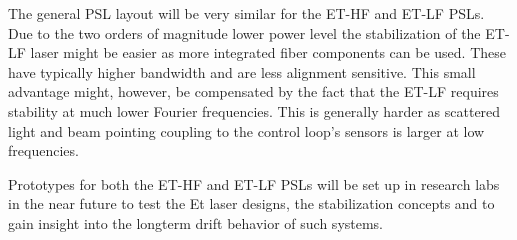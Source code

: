 The general PSL layout will be very similar for the ET-HF and ET-LF PSLs. Due to the two orders of magnitude lower power level the stabilization of the ET-LF laser might be easier as more integrated fiber components can be used. These have typically higher bandwidth and are less alignment sensitive. This small advantage might, however, be compensated by the fact that the ET-LF requires stability at much lower Fourier frequencies. This is generally harder as scattered light and beam pointing coupling to the control loop's sensors is larger at low frequencies. 

Prototypes for both the ET-HF and ET-LF PSLs will be set up in research labs in the near future to test the Et laser designs, the stabilization concepts and to gain insight into the longterm drift behavior of such systems. 